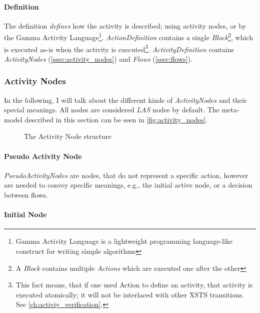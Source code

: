 \paragraph{Definition}\label{par:definition}

The definition \emph{defines} how the activity is described; using activity nodes, or by the Gamma Activity Language\footnote{Gamma Activity Language is a lightweight programming language-like construct for writing simple algorithms}. \emph{ActionDefinition} contains a single \emph{Block}\footnote{A \emph{Block} contains multiple \emph{Actions} which are executed one after the other}, which is executed as-is when the activity is executed\footnote{This fact means, that if one used Action to define an activity, that activity is executed atomically; it will not be interlaced with other XSTS transitions. See \autoref{ch:activiy_verification}.}. \emph{ActivityDefinition} contains \emph{ActivityNodes} (\autoref{ssec:activity_nodes}) and \emph{Flows} (\autoref{ssec:flows}).

\subsubsection*{Activity Nodes}\label{ssec:activity_nodes}

In the following, I will talk about the different kinds of \emph{ActivityNodes} and their special meanings. All nodes are considered \emph{LAS} nodes by default. The meta-model described in this section can be seen in \autoref{fig:activity_nodes}.

\begin{figure}[!ht]
	\centering
	
	\caption{The Activity Node structure}
	\label{fig:activity_nodes}
\end{figure}

\paragraph{Pseudo Activity Node}

\emph{PseudoActivityNodes} are nodes, that do not represent a specific action, however are needed to convey specific meanings, e.g., the initial active node, or a decision between flows.

\paragraph{Initial Node}

